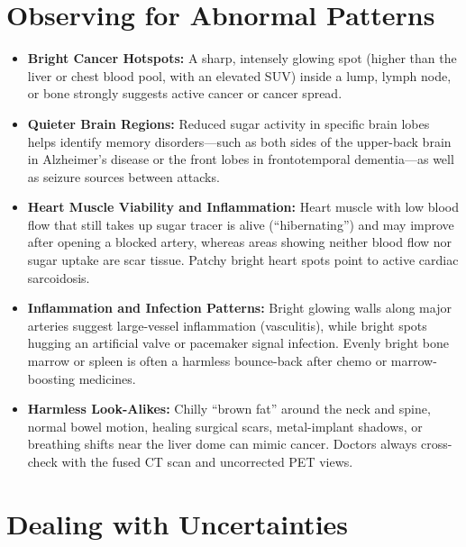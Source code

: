 \section{Observing for Abnormal Patterns}

\begin{itemize}
    \item \textbf{Bright Cancer Hotspots:} A sharp, intensely glowing spot (higher than the liver or chest blood pool, with an elevated SUV) inside a lump, lymph node, or bone strongly suggests active cancer or cancer spread.
    \item \textbf{Quieter Brain Regions:} Reduced sugar activity in specific brain lobes helps identify memory disorders---such as both sides of the upper-back brain in Alzheimer's disease or the front lobes in frontotemporal dementia---as well as seizure sources between attacks.
    \item \textbf{Heart Muscle Viability and Inflammation:} Heart muscle with low blood flow that still takes up sugar tracer is alive (``hibernating'') and may improve after opening a blocked artery, whereas areas showing neither blood flow nor sugar uptake are scar tissue. Patchy bright heart spots point to active cardiac sarcoidosis.
    \item \textbf{Inflammation and Infection Patterns:} Bright glowing walls along major arteries suggest large-vessel inflammation (vasculitis), while bright spots hugging an artificial valve or pacemaker signal infection. Evenly bright bone marrow or spleen is often a harmless bounce-back after chemo or marrow-boosting medicines.
    \item \textbf{Harmless Look-Alikes:} Chilly ``brown fat'' around the neck and spine, normal bowel motion, healing surgical scars, metal-implant shadows, or breathing shifts near the liver dome can mimic cancer. Doctors always cross-check with the fused CT scan and uncorrected PET views.
\end{itemize}

\section{Dealing with Uncertainties}

